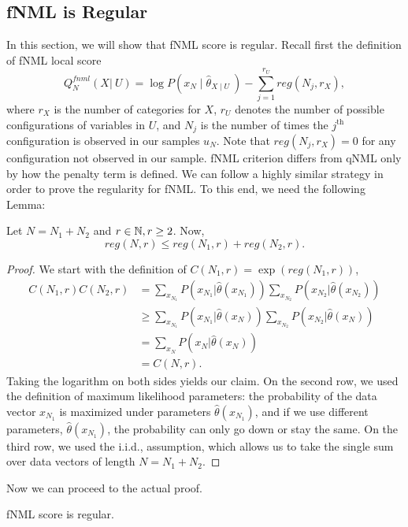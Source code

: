 \subsection{fNML is Regular}
In this section, we will show that fNML score is regular. Recall first the definition of fNML local score
\begin{equation}
Q^{fnml}_N(X  \vert \ U) = \log P(x_N \mid \hat{\theta}_{X\mid U} \ ) - \sum_{j = 1}^{r_U} reg(N_j,r_X),
\end{equation}where $r_X$ is the number of categories for $X$, $r_U$ denotes the number of possible configurations of variables in $U$, and $N_j$ is the number of times the $j^\text{th}$ configuration is observed in our samples $u_N$. Note that $reg(N_j,r_X) = 0$ for any configuration not observed in our sample. 
fNML criterion differs from qNML only by how the penalty term is defined. We can follow a highly similar strategy in order to prove the regularity for fNML. To this end, we need the following Lemma:
\begin{lemma}\label{regineq}
Let $N = N_1 + N_2$ and $r \in\mathbb{N}, r \geq 2$. Now,
$$
reg(N,r) \leq reg(N_1,r) + reg(N_2,r).
$$
\end{lemma}
\begin{proof}
We start with the definition of $C(N_1,r) = \exp(reg(N_1,r))$,
\begin{align*}
C(N_1,r)C(N_2,r) &= \sum_{x_{N_1}}P(x_{N_1} \vert \hat{\theta}(x_{N_1} ))\sum_{x_{N_2}}P(x_{N_2} \vert \hat{\theta}(x_{N_2} ))\\ & \geq
\sum_{x_{N_1}}P(x_{N_1} \vert \hat{\theta}(x_{N} ))\sum_{x_{N_2}}P(x_{N_2} \vert \hat{\theta}(x_{N} )) \\ &=
\sum_{x_{N}}P(x_{N} \vert \hat{\theta}(x_{N} )) \\ & = C(N,r).
\end{align*}Taking the logarithm on both sides yields our claim. On the second row, we used the definition of maximum likelihood parameters: the probability of the data vector $x_{N_1}$ is maximized under parameters $\hat{\theta}(x_{N_1})$, and if we use different parameters, $\hat{\theta}(x_{N_1})$, the probability can only go down or stay the same. On the third row, we used the i.i.d., assumption, which allows us to take the single sum over data vectors of length $N = N_1 + N_2$.
\end{proof}
Now we can proceed to the actual proof.
\begin{theorem}
fNML score is regular.
\end{theorem}
